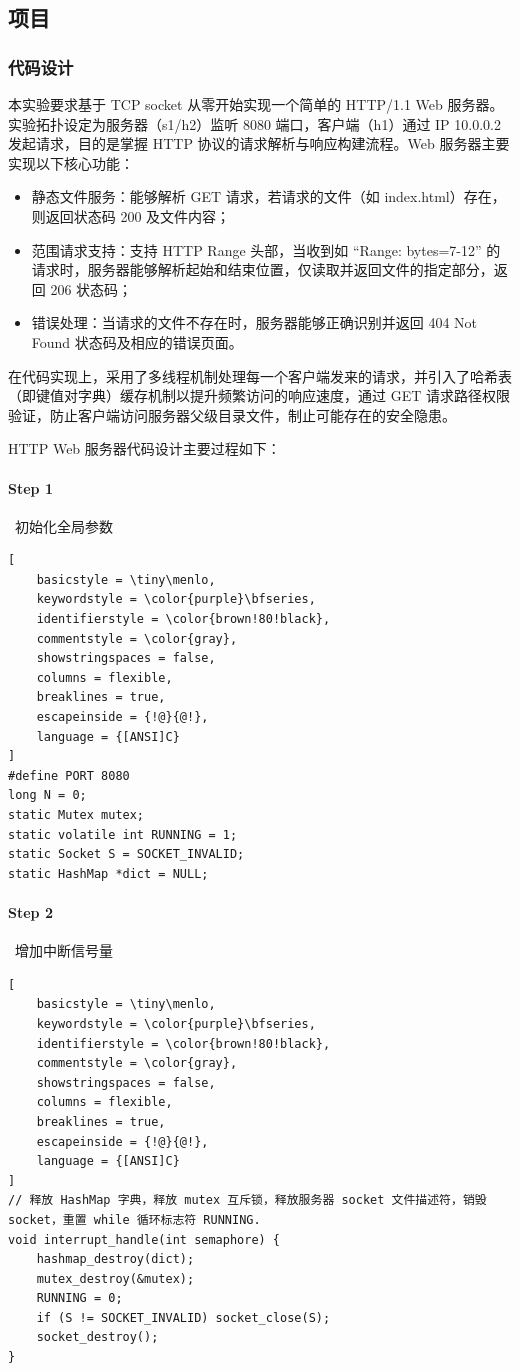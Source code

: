 \documentclass{article}
\begin{document}
\subsection{项目}
\subsubsection{代码设计}
本实验要求基于 TCP socket 从零开始实现一个简单的 HTTP/1.1 Web 服务器。实验拓扑设定为服务器（s1/h2）监听 8080 端口，客户端（h1）通过 IP 10.0.0.2 发起请求，目的是掌握 HTTP 协议的请求解析与响应构建流程。Web 服务器主要实现以下核心功能：
\begin{itemize}
    \item 静态文件服务：能够解析 GET 请求，若请求的文件（如 index.html）存在，则返回状态码 200 及文件内容；
    \item 范围请求支持：支持 HTTP Range 头部，当收到如 ``Range: bytes=7-12'' 的请求时，服务器能够解析起始和结束位置，仅读取并返回文件的指定部分，返回 206 状态码；
    \item 错误处理：当请求的文件不存在时，服务器能够正确识别并返回 404 Not Found 状态码及相应的错误页面。
\end{itemize}

在代码实现上，采用了多线程机制处理每一个客户端发来的请求，并引入了哈希表（即键值对字典）缓存机制以提升频繁访问的响应速度，通过 GET 请求路径权限验证，防止客户端访问服务器父级目录文件，制止可能存在的安全隐患。

HTTP Web 服务器代码设计主要过程如下：

\paragraph*{Step 1}~{初始化全局参数}
\begin{lstlisting}[
    basicstyle = \tiny\menlo,
    keywordstyle = \color{purple}\bfseries,
    identifierstyle = \color{brown!80!black},
    commentstyle = \color{gray},
    showstringspaces = false,
    columns = flexible,
    breaklines = true,
    escapeinside = {!@}{@!},
    language = {[ANSI]C}
]
#define PORT 8080
long N = 0;
static Mutex mutex;
static volatile int RUNNING = 1;
static Socket S = SOCKET_INVALID;
static HashMap *dict = NULL;
\end{lstlisting}

\paragraph*{Step 2}~{增加中断信号量}
\begin{lstlisting}[
    basicstyle = \tiny\menlo,
    keywordstyle = \color{purple}\bfseries,
    identifierstyle = \color{brown!80!black},
    commentstyle = \color{gray},
    showstringspaces = false,
    columns = flexible,
    breaklines = true,
    escapeinside = {!@}{@!},
    language = {[ANSI]C}
]
// 释放 HashMap 字典，释放 mutex 互斥锁，释放服务器 socket 文件描述符，销毁 socket，重置 while 循环标志符 RUNNING.
void interrupt_handle(int semaphore) {
    hashmap_destroy(dict);
    mutex_destroy(&mutex);
    RUNNING = 0;
    if (S != SOCKET_INVALID) socket_close(S);
    socket_destroy();
}
\end{lstlisting}
\end{document}
